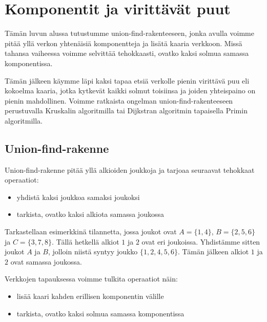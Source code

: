 \chapter{Komponentit ja virittävät puut}

Tämän luvun alussa tutustumme union-find-rakenteeseen,
jonka avulla voimme pitää yllä verkon
yhtenäisiä komponentteja ja lisätä kaaria verkkoon.
Missä tahansa vaiheessa voimme selvittää tehokkaasti,
ovatko kaksi solmua samassa komponentissa.

Tämän jälkeen käymme läpi kaksi tapaa etsiä verkolle
pienin virittävä puu eli kokoelma kaaria,
jotka kytkevät kaikki solmut toisiinsa ja joiden
yhteispaino on pienin mahdollinen.
Voimme ratkaista ongelman union-find-rakenteeseen
perustuvalla Kruskalin algoritmilla tai
Dijkstran algoritmin tapaisella Primin algoritmilla.

\section{Union-find-rakenne}

Union-find-rakenne pitää yllä alkioiden joukkoja ja tarjoaa
seuraavat tehokkaat operaatiot:

\begin{itemize}
\item yhdistä kaksi joukkoa samaksi joukoksi
\item tarkista, ovatko kaksi alkiota samassa joukossa
\end{itemize}

Tarkastellaan esimerkkinä tilannetta, jossa joukot ovat
$A=\{1,4\}$, $B=\{2,5,6\}$ ja $C=\{3,7,8\}$.
Tällä hetkellä alkiot $1$ ja $2$ ovat eri joukoissa.
Yhdistämme sitten joukot $A$ ja $B$,
jolloin niistä syntyy joukko $\{1,2,4,5,6\}$.
Tämän jälkeen alkiot $1$ ja $2$ ovat samassa joukossa.

Verkkojen tapauksessa voimme tulkita operaatiot näin:

\begin{itemize}
\item lisää kaari kahden erillisen komponentin välille
\item tarkista, ovatko kaksi solmua samassa komponentissa
\end{itemize}

